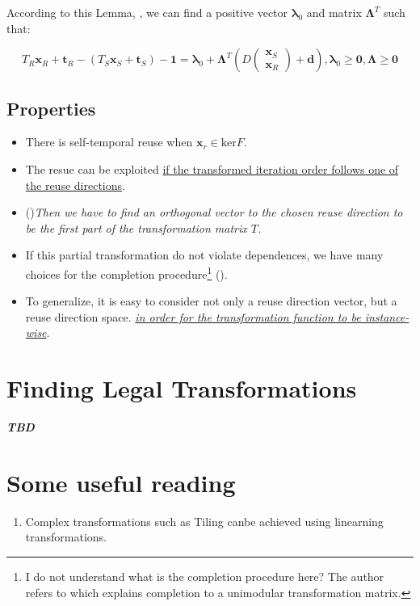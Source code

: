 According to this Lemma, {\color{red}{for each edge in the dependence graph}},
we can find a positive vector $\bm{\lambda}_0$ and matrix $\bm{\Lambda}^T$ such that:

\begin{equation}
  T_R\bm{x}_R+\bm{t}_R - (T_S\bm{x}_S+\bm{t}_S) -\bm{1} = \bm{\lambda}_0 +
  \bm{\Lambda}^T \left( D \left( \begin{matrix}\bm{x}_S \\ \bm{x}_R \end{matrix} \right) + \bm{d} \right),
  \bm{\lambda}_0 \ge \bm{0}, \bm{\Lambda} \ge \bm{0}
\end{equation}

\subsection{Properties}

\begin{itemize}
  \item There is self-temporal reuse when $\bm{x}_r \in \text{ker}F$.
  \item The resue can be exploited \underline{if the transformed
  iteration order follows one of the reuse directions}.
  \item ({})\emph{Then we have to find an orthogonal
  vector to the chosen reuse direction to be the first part of the transformation
  matrix $T$.}
  \item If this partial transformation do not violate dependences, we have many choices
  for the completion procedure\footnote{I do not understand what is the completion
  procedure here? The author refers to \cite{griebl1998code} which explains completion
  to a unimodular transformation matrix.} ({}).
  \item To generalize, it is easy to consider not only a reuse direction vector,
  but a reuse direction space.
  \underline{\emph{in order for the transformation function to be instance-wise}}.
\end{itemize}

\section{Finding Legal Transformations}

\textbf{\textit{TBD}}


\section{Some useful reading}
\begin{enumerate}
  \item Complex transformations such as Tiling canbe achieved using linearning transformations\cite{xue1997tiling}.
\end{enumerate}
